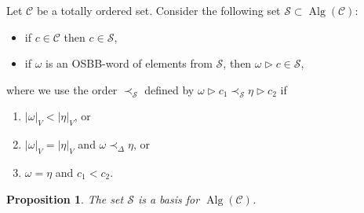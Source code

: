 \documentclass[10pt,a4paper]{amsart}
\newcommand*{\Alg}{\operatorname{Alg}}
\numberwithin{equation}{section}
\newtheorem{Proposition}[Theorem]{Proposition}
 { \theoremstyle{definition}
\newtheorem{Definition}[Theorem]{Definition}
\newtheorem{Note}[Theorem]{Note}
\newtheorem{Example}[Theorem]{Example}
\newtheorem{Remark}[Theorem]{Remark} }
\begin{document}
Let $\mathcal{C}$ be a totally ordered set. Consider the following set $\mathcal{S} \subset \Alg(\mathcal{C})$:
\begin{itemize}\itemsep=0pt
 \item if $c\in \mathcal{C}$ then $c \in \mathcal{S}$,
 \item if $\omega$ is an OSBB-word of elements from $\mathcal{S}$, then $\omega \rhd c \in \mathcal{S}$,
\end{itemize}
where we use the order $\prec_{\mathcal{S}}$ defined by $\omega \rhd c_1 \prec_{\mathcal{S}} \eta \rhd c_2$ if
\begin{enumerate}\itemsep=0pt
 \item[(i)] $|\omega|_V < |\eta|_V$, or
 \item[(ii)] $|\omega|_V = |\eta|_V$ and $\omega \prec_{\Delta} \eta$, or
 \item[(iii)] $\omega = \eta$ and $c_1 < c_2$.
\end{enumerate}

\begin{Proposition}%
 The set $\mathcal{S}$ is a basis for $\Alg(\mathcal{\mathcal{C}})$.
\end{Proposition}
\end{document}
